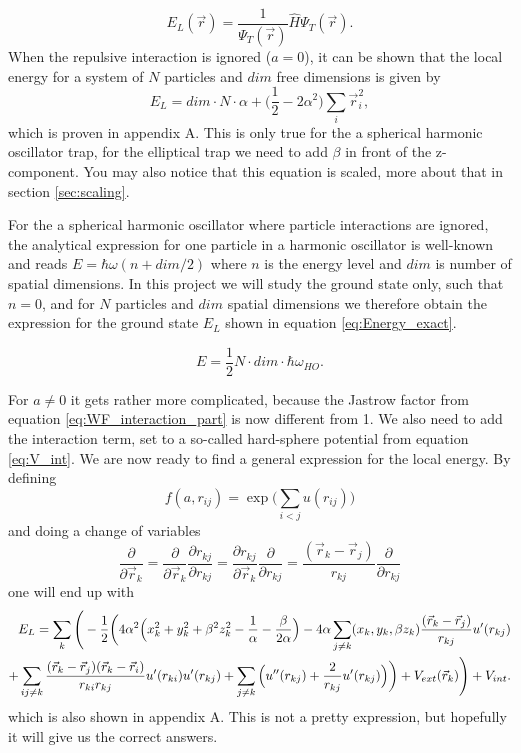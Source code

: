 \documentclass[norsk,a4paper,12pt]{article}
\begin{document}
\begin{equation}
E_L(\vec{r})=\frac{1}{\Psi_T(\vec{r})}\hat{H}\Psi_T(\vec{r}).
\label{eq:Local_energy}
\end{equation}
When the repulsive interaction is ignored ($a=0$), it can be shown that the local energy for a system of $N$ particles and $dim$ free dimensions is given by
\begin{equation}
E_L=dim\cdot N\cdot \alpha + \Big(\frac{1}{2}-2\alpha^2\Big)\sum_i\vec{r}_i^2,
\end{equation}
which is proven in appendix A. This is only true for the a spherical harmonic oscillator trap, for the elliptical trap we need to add $\beta$ in front of the z-component. You may also notice that this equation is scaled, more about that in section \ref{sec:scaling}.

For the a spherical harmonic oscillator where particle interactions are ignored, the analytical expression for one particle in a harmonic oscillator is well-known and reads $E = \hbar\omega(n + dim/2)$ where $n$ is the energy level and $dim$ is number of spatial dimensions. In this project we will study the ground state only, such that $n=0$, and for $N$ particles and $dim$ spatial dimensions we therefore obtain the expression for the ground state $E_L$ shown in equation \ref{eq:Energy_exact}.

\begin{equation}
E = \frac{1}{2}N\cdot dim\cdot\hbar\omega_{HO}.
\label{eq:Energy_exact}
\end{equation}


For $a\neq0$ it gets rather more complicated, because the Jastrow factor from equation \ref{eq:WF_interaction_part} is now different from 1. We also need to add the interaction term, set to a so-called hard-sphere potential from equation \ref{eq:V_int}. We are now ready to find a general expression for the local energy. By defining
\begin{equation}
f(a, r_{ij})=\exp{\bigg(\sum_{i<j}u(r_{ij})\bigg)}
\end{equation}
and doing a change of variables
\begin{equation}
\frac{\partial}{\partial \vec{r}_k}=\frac{\partial}{\partial \vec{r}_k}\frac{\partial r_{kj}}{\partial r_{kj}}=\frac{\partial r_{kj}}{\partial \vec{r}_k}\frac{\partial}{\partial r_{kj}}=\frac{(\vec{r}_k-\vec{r}_j)}{r_{kj}}\frac{\partial}{\partial r_{kj}}
\end{equation}
one will end up with
\begin{align}
E_L=\sum_k\Bigg(-\frac{1}{2}\bigg(4\alpha^2\Big(x_k^2+y_k^2+\beta^2z_k^2-\frac{1}{\alpha}-\frac{\beta}{2\alpha}\Big)
-4\alpha\sum_{j\neq k}(x_k, y_k, \beta z_k)\frac{(\vec{r}_k-\vec{r}_j)}{r_{kj}}u'(r_{kj})\notag\\
+\sum_{ij\neq k}\frac{(\vec{r}_k-\vec{r}_j)(\vec{r}_k-\vec{r}_i)}{r_{ki}r_{kj}}u'(r_{ki})u'(r_{kj})
+\sum_{j\neq k}\Big(u''(r_{kj})+\frac{2}{r_{kj}}u'(r_{kj})\Big)\bigg)+V_{ext}(\vec{r}_k)\Bigg) + V_{int}.\notag
\label{EL_total}
\end{align}
which is also shown in appendix A. This is not a pretty expression, but hopefully it will give us the correct answers. 
\end{document}
